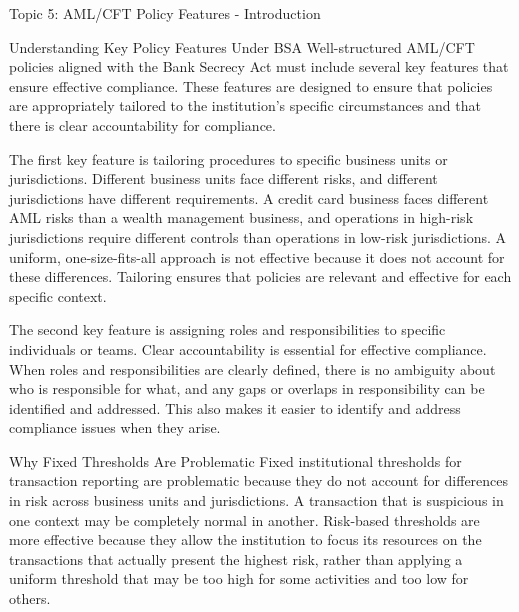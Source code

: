 \documentclass[8pt]{beamer}  %
\begin{document}
	\begin{frame}{Topic 5: AML/CFT Policy Features - Introduction}
		\begin{block}{\large Understanding Key Policy Features Under BSA}
			Well-structured AML/CFT policies aligned with the Bank Secrecy Act must include several key features that ensure effective compliance. These features are designed to ensure that policies are appropriately tailored to the institution's specific circumstances and that there is clear accountability for compliance.
			
			The first key feature is tailoring procedures to specific business units or jurisdictions. Different business units face different risks, and different jurisdictions have different requirements. A credit card business faces different AML risks than a wealth management business, and operations in high-risk jurisdictions require different controls than operations in low-risk jurisdictions. A uniform, one-size-fits-all approach is not effective because it does not account for these differences. Tailoring ensures that policies are relevant and effective for each specific context.
			
			The second key feature is assigning roles and responsibilities to specific individuals or teams. Clear accountability is essential for effective compliance. When roles and responsibilities are clearly defined, there is no ambiguity about who is responsible for what, and any gaps or overlaps in responsibility can be identified and addressed. This also makes it easier to identify and address compliance issues when they arise.
		\end{block}
		
		\vspace{0.2cm}
		\begin{block}{\large Why Fixed Thresholds Are Problematic}
			Fixed institutional thresholds for transaction reporting are problematic because they do not account for differences in risk across business units and jurisdictions. A transaction that is suspicious in one context may be completely normal in another. Risk-based thresholds are more effective because they allow the institution to focus its resources on the transactions that actually present the highest risk, rather than applying a uniform threshold that may be too high for some activities and too low for others.
		\end{block}
	\end{frame}
	
\end{document}
